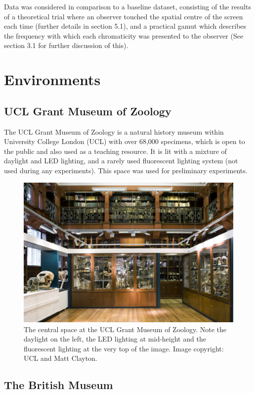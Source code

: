 Data was considered in comparison to a baseline dataset, consisting of the results of a theoretical trial where an observer touched the spatial centre of the screen each time (further details in section 5.1), and a practical gamut which describes the frequency with which each chromaticity was presented to the observer (See section 3.1 for further discussion of this).

\section{Environments}
\subsection*{UCL Grant Museum of Zoology}

The UCL Grant Museum of Zoology is a natural history museum within University College London (UCL) with over 68,000 specimens, which is open to the public and also used as a teaching resource. It is lit with a mixture of daylight and LED lighting, and a rarely used fluorescent lighting system (not used during any experiments).
This space was used for preliminary experiments. 

\begin{figure}[htb!]
\includegraphics[width=\textwidth]{figs/tablet/grant.jpg} 
\caption{The central space at the UCL Grant Museum of Zoology. Note the daylight on the left, the LED lighting at mid-height and the fluorescent lighting at the very top of the image. Image copyright: UCL and Matt Clayton.}
\label{fig:grant}
\end{figure}

\subsection*{The British Museum}

